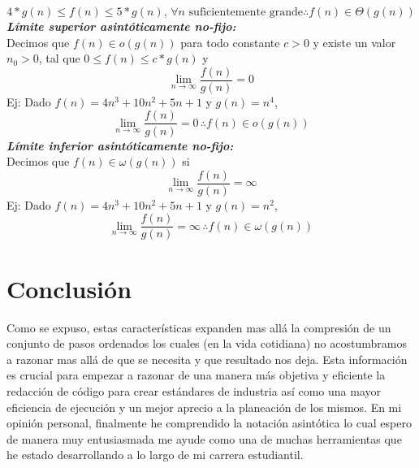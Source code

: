 \documentclass[letterpaper, 12pt]{article}
\begin{document}
\begin{justify}
        \[4*g(n)\leq f(n)\leq 5*g(n),\,\forall n \text{ suficientemente grande} \therefore f(n)\in \Theta (g(n))\]
        \textbf{\emph{Límite superior asintóticamente no-fijo:}}\\
        Decimos que \(f(n)\in o(g(n))\) para todo constante \(c>0\) y existe un valor \(n_0>0\), tal que \(0\leq f(n)\leq c*g(n)\) y
        \[\lim_{n\to\infty} \frac{f(n)}{g(n)}=0\]
        Ej: Dado \(f(n)=4n^3+10n^2+5n+1\) y \(g(n)=n^4\),
        \[\lim_{n\to\infty}\frac{f(n)}{g(n)}=0\,\therefore f(n)\in o(g(n))\]
        \textbf{\emph{Límite inferior asintóticamente no-fijo:}}\\  
        Decimos que \(f(n)\in \omega(g(n))\) si
        \[\lim_{n\to\infty} \frac{f(n)}{g(n)}=\infty\]
        Ej: Dado \(f(n)=4n^3+10n^2+5n+1\) y \(g(n)=n^2\),
        \[\lim_{n\to\infty} \frac{f(n)}{g(n)}=\infty\,\therefore f(n)\in \omega(g(n))\]
        \section{Conclusión}
        Como se expuso, estas características expanden mas allá la compresión de un conjunto de pasos ordenados los cuales (en la vida cotidiana) no acostumbramos a razonar mas allá de que se necesita y que resultado nos deja. Esta información es crucial para empezar
        a razonar de una manera más objetiva y eficiente la redacción de código para crear estándares de industria así como una mayor eficiencia de ejecución y un mejor aprecio a la planeación de los mismos. En mi opinión personal, finalmente he comprendido la notación asintótica
        lo cual espero de manera muy entusiasmada me ayude como una de muchas herramientas que he estado desarrollando a lo largo de mi carrera estudiantil.
    \end{justify}

    \newpage
        \lhead{}
        \printbibliography
\end{document}
